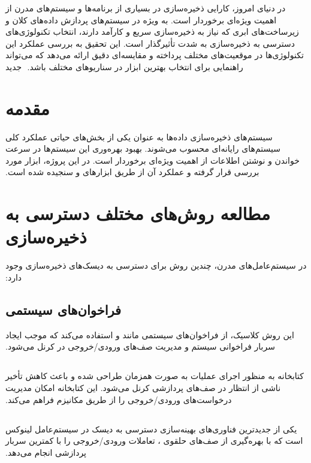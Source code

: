 ‫
‫در دنیای امروز، کارایی ذخیره‌سازی در بسیاری از برنامه‌ها و سیستم‌های مدرن از اهمیت ویژه‌ای برخوردار است. به ویژه در سیستم‌های پردازش داده‌های کلان و زیرساخت‌های ابری که نیاز به ذخیره‌سازی سریع و کارآمد دارند، انتخاب تکنولوژی‌های دسترسی به ذخیره‌سازی به شدت تأثیرگذار است. این تحقیق به بررسی عملکرد این تکنولوژی‌ها در موقعیت‌های مختلف پرداخته و مقایسه‌ای دقیق ارائه می‌دهد که می‌تواند راهنمایی برای انتخاب بهترین ابزار در سناریوهای مختلف باشد.
‫
‫‌جدید
‫
‫\section{مقدمه}
‫سیستم‌های ذخیره‌سازی داده‌ها به عنوان یکی از بخش‌های حیاتی عملکرد کلی سیستم‌های رایانه‌ای محسوب می‌شوند. بهبود بهره‌وری این سیستم‌ها در سرعت خواندن و نوشتن اطلاعات از اهمیت ویژه‌ای برخوردار است. در این پروژه، ابزار  مورد بررسی قرار گرفته و عملکرد آن از طریق ابزارهای  و  سنجیده شده است.
‫
‫\section*{مطالعه روش‌های مختلف دسترسی به ذخیره‌سازی}
‫در سیستم‌عامل‌های مدرن، چندین روش برای دسترسی به دیسک‌های ذخیره‌سازی وجود دارد:
‫
‫\subsection*{فراخوان‌های سیستمی }
‫این روش کلاسیک، از فراخوان‌های سیستمی مانند  و  استفاده می‌کند که موجب ایجاد سربار فراخوانی سیستم و مدیریت صف‌های ورودی/خروجی در کرنل می‌شود.
‫
‫\subsection*{}
‫کتابخانه  به منظور اجرای عملیات  به صورت همزمان طراحی شده و باعث کاهش تأخیر ناشی از انتظار در صف‌های پردازشی کرنل می‌شود. این کتابخانه امکان مدیریت درخواست‌های ورودی/خروجی را از طریق مکانیزم  فراهم می‌کند.
‫
‫\subsection*{}
‫ یکی از جدیدترین فناوری‌های بهینه‌سازی دسترسی به دیسک در سیستم‌عامل لینوکس است که با بهره‌گیری از صف‌های حلقوی ، تعاملات ورودی/خروجی را با کمترین سربار پردازشی انجام می‌دهد.
‫
‫\subsection*{}
